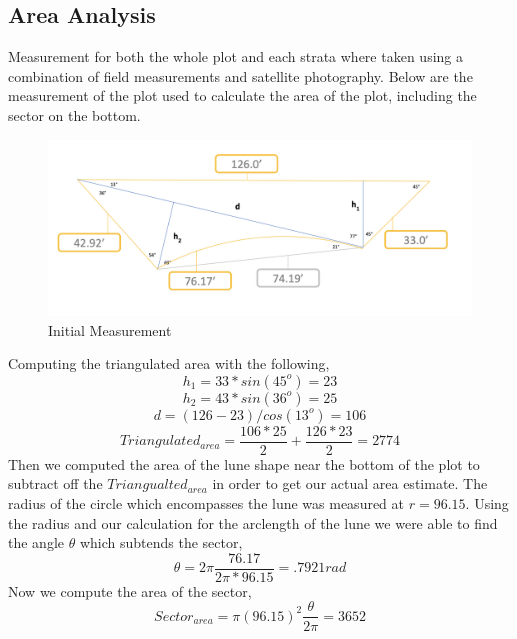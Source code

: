 \documentclass[12pt]{amsart}
\begin{document}
\subsection*{Area Analysis}
Measurement for both the whole plot and each strata where taken using a combination of field measurements and satellite photography. Below are the measurement of the plot
used to calculate the area of the plot, including the sector on the bottom. 
\begin{figure}[H]
    \begin{center}
    \caption{Initial Measurement}
    \includegraphics[width=\linewidth]{fig2.jpg}
    \end{center}
    \end{figure}
Computing the triangulated area with the following, 
\begin{equation*}
    h_1 = 33*sin(45^o) = 23
\end{equation*}
\begin{equation*}
    h_2 = 43*sin(36^o) = 25
\end{equation*}
\begin{equation*}
    d = (126 - 23)/cos(13^o) = 106
\end{equation*}
\begin{equation*}
    Triangulated_{area} = \dfrac{106*25}{2} + \dfrac{126*23}{2} = 2774
\end{equation*}
Then we computed the area of the lune shape near the bottom of the plot to subtract off the $Triangualted_{area}$ in order to get our actual area estimate.
The radius of the circle which encompasses the lune was measured at $r = 96.15$. Using the radius and our calculation for the arclength of the lune we were able 
to find the angle $\theta$ which subtends the sector, 
\begin{equation*}
    \theta = 2\pi\dfrac{76.17}{2\pi*96.15} = .7921 rad
\end{equation*}
Now we compute the area of the sector, 
\begin{equation*}
    Sector_{area} = \pi(96.15)^2\dfrac{\theta}{2\pi} = 3652
\end{equation*}
\end{document}
